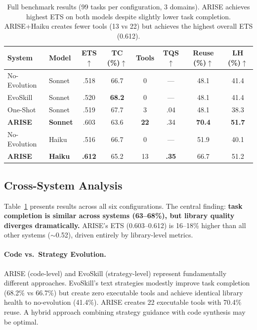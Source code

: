 \documentclass[]{ceurart}
\begin{document}
\begin{table}[t]
\centering
\small
\begin{tabular}{llcccccc}
\toprule
\textbf{System} & \textbf{Model} & \textbf{ETS}$\uparrow$ & \textbf{TC (\%)}$\uparrow$ & \textbf{Tools} & \textbf{TQS}$\uparrow$ & \textbf{Reuse (\%)}$\uparrow$ & \textbf{LH (\%)}$\uparrow$ \\
\midrule
No-Evolution & Sonnet & .518 & 66.7 & 0 & --- & 48.1 & 41.4 \\
EvoSkill & Sonnet & .520 & \textbf{68.2} & 0 & --- & 48.1 & 41.4 \\
One-Shot & Sonnet & .519 & 67.7 & 3 & .04 & 48.1 & 38.3 \\
\textbf{ARISE} & \textbf{Sonnet} & .603 & 63.6 & \textbf{22} & .34 & \textbf{70.4} & \textbf{51.7} \\
\midrule
No-Evolution & Haiku & .516 & 66.7 & 0 & --- & 51.9 & 40.1 \\
\textbf{ARISE} & \textbf{Haiku} & \textbf{.612} & 65.2 & 13 & \textbf{.35} & 66.7 & 51.2 \\
\bottomrule
\end{tabular}
\caption{Full benchmark results (99 tasks per configuration, 3 domains). ARISE achieves highest ETS on both models despite slightly lower task completion. ARISE+Haiku creates fewer tools (13 vs 22) but achieves the highest overall ETS (0.612).}
\label{tab:results_full}
\end{table}

\subsection{Cross-System Analysis}

Table~\ref{tab:results_full} presents results across all six configurations. The central finding: \textbf{task completion is similar across systems (63--68\%), but library quality diverges dramatically.} ARISE's ETS (0.603--0.612) is 16--18\% higher than all other systems ($\sim$0.52), driven entirely by library-level metrics.

\paragraph{Code vs.\ Strategy Evolution.} ARISE (code-level) and EvoSkill (strategy-level) represent fundamentally different approaches. EvoSkill's text strategies modestly improve task completion (68.2\% vs 66.7\%) but create zero executable tools and achieve identical library health to no-evolution (41.4\%). ARISE creates 22 executable tools with 70.4\% reuse. A hybrid approach combining strategy guidance with code synthesis may be optimal.
\end{document}

